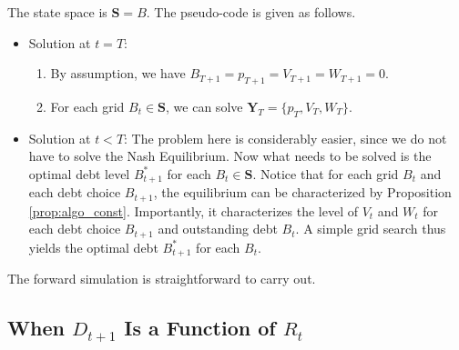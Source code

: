 \documentclass[twoside,11pt,leqno]{article}
\renewcommand{\vec}[1]{\ensuremath{\mathbf{#1}}}
\begin{document}
The state space is $\vec{S} = B$. The pseudo-code is given as follows.
\begin{itemize}
    \item
    Solution at $t = T$:
    \begin{enumerate}
        \item
        By assumption, we have $B_{T+1} = p_{T+1} = V_{T+1} = W_{T+1} = 0$.
        \item
        For each grid $B_t \in \vec{S}$, we can solve $\vec{Y}_T = \{p_T, V_T, W_T \}$.
    \end{enumerate}
    \item
    Solution at $t < T$: The problem here is considerably easier, since we do not have to solve the Nash Equilibrium. Now what needs to be solved is the optimal debt level $B^*_{t+1}$ for each $B_t \in \vec{S}$. Notice that for each grid $B_t$ and each debt choice $B_{t+1}$, the equilibrium can be characterized by Proposition \ref{prop:algo_const}. Importantly, it characterizes the level of $V_t$ and $W_t$ for each debt choice $B_{t+1}$ and outstanding debt $B_t$. A simple grid search thus yields the optimal debt $B^*_{t+1}$ for each $B_t$.
\end{itemize}
The forward simulation is straightforward to carry out.

\subsection{When $D_{t+1}$ Is a Function of $R_t$}
\end{document}
